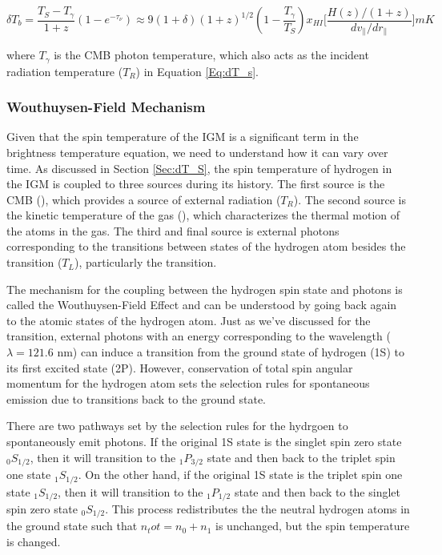 \begin{equation}\label{Eq:dT_b}
\delta T_b = \frac{T_S - T_\gamma}{1+z}(1-e^{-\tau_\nu}) \approx 9 (1+\delta) (1+z)^{1/2} (1-\frac{T_\gamma}{T_S})x_{HI} \big[ \frac{H(z)/(1+z)}{dv_{\parallel}/dr_{\parallel}} \big] mK
\end{equation}

where $T_\gamma$ is the CMB photon temperature, which also acts as the incident radiation temperature ($T_R$) in Equation \ref{Eq:dT_s}. 

\subsubsection{Wouthuysen-Field Mechanism}\label{Sec:WFM}
Given that the spin temperature of the IGM is a significant term in the brightness temperature equation, we need to understand how it can vary over time. As discussed in Section \ref{Sec:dT_S}, the spin temperature of hydrogen in the IGM is coupled to three sources during its history. The first source is the CMB (\tg), which provides a source of external radiation ($T_R$). The second source is the kinetic temperature of the gas (\tk), which characterizes the thermal motion of the atoms in the gas. The third and final source is external photons corresponding to the transitions between states of the hydrogen atom besides the \cm transition ($T_L$), particularly the \lya transition. 

The mechanism for the coupling between the hydrogen spin state and \lya photons is called the Wouthuysen-Field Effect \cite{wouthuysen_1952}\cite{field_1958} and can be understood by going back again to the atomic states of the hydrogen atom. Just as we've discussed for the \cm transition, external photons with an energy corresponding to the \lya wavelength ($\lambda = 121.6$ nm) can induce a transition from the ground state of hydrogen (1S) to its first excited state (2P). However, conservation of total spin angular momentum for the hydrogen atom sets the selection rules for spontaneous emission due to transitions back to the ground state. 

There are two pathways set by the selection rules for the hydrgoen to spontaneously emit \lya photons. If the original 1S state is the singlet spin zero state $_0S_{1/2}$, then it will transition to the $_1P_{3/2}$ state and then back to the triplet spin one state $_1S_{1/2}$. On the other hand, if the original 1S state is the triplet spin one state $_1S_{1/2}$, then it will transition to the $_1P_{1/2}$ state and then back to the singlet spin zero state $_0S_{1/2}$. This process redistributes the the neutral hydrogen atoms in the ground state such that $n_tot = n_0 + n_1$ is unchanged, but the spin temperature is changed. 

